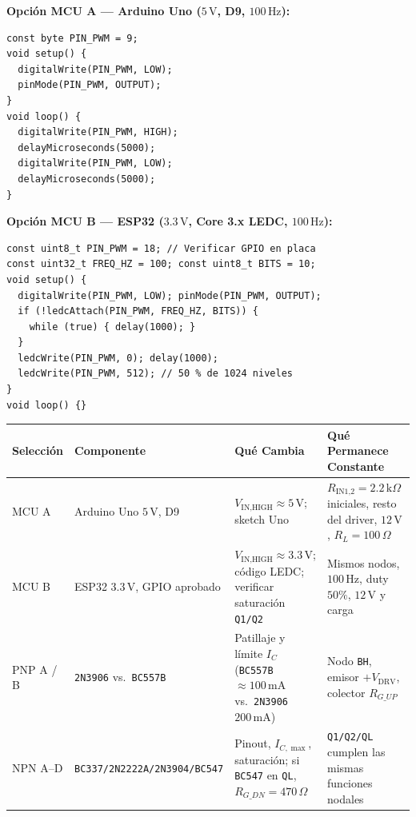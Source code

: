 \documentclass[10pt, a4paper, landscape]{article}
\begin{document}
\begin{minipage}[t]{0.46\linewidth}
\textbf{Opción MCU A — Arduino Uno ($5\,\text{V}$, D9, $100\,\text{Hz}$):}
{\footnotesize
\begin{verbatim}
const byte PIN_PWM = 9;
void setup() {
  digitalWrite(PIN_PWM, LOW);
  pinMode(PIN_PWM, OUTPUT);
}
void loop() {
  digitalWrite(PIN_PWM, HIGH);
  delayMicroseconds(5000);
  digitalWrite(PIN_PWM, LOW);
  delayMicroseconds(5000);
}
\end{verbatim}
}
\end{minipage}\hfill
\begin{minipage}[t]{0.52\linewidth}
\textbf{Opción MCU B — ESP32 ($3.3\,\text{V}$, Core 3.x LEDC, $100\,\text{Hz}$):}
{\footnotesize
\begin{verbatim}
const uint8_t PIN_PWM = 18; // Verificar GPIO en placa
const uint32_t FREQ_HZ = 100; const uint8_t BITS = 10;
void setup() {
  digitalWrite(PIN_PWM, LOW); pinMode(PIN_PWM, OUTPUT);
  if (!ledcAttach(PIN_PWM, FREQ_HZ, BITS)) {
    while (true) { delay(1000); }
  }
  ledcWrite(PIN_PWM, 0); delay(1000);
  ledcWrite(PIN_PWM, 512); // 50 % de 1024 niveles
}
void loop() {}
\end{verbatim}
}
\end{minipage}

\par\vspace{0.1cm}\noindent
\renewcommand{\arraystretch}{1.15}
{\footnotesize
\begin{tabularx}{\linewidth}{|l|l|>{\raggedright\arraybackslash}X|>{\raggedright\arraybackslash}p{7.5cm}|}
\hline
\rowcolor{ucbgray}
\textbf{Selección} & \textbf{Componente} & \textbf{Qué Cambia} & \textbf{Qué Permanece Constante} \\ \hline
MCU A & Arduino Uno $5\,\text{V}$, D9 & $V_{\text{IN,HIGH}} \approx 5\,\text{V}$; sketch Uno & $R_{\text{IN1,2}}=2.2\,\text{k}\Omega$ iniciales, resto del driver, $12\,\text{V}$, $R_L=100\,\Omega$ \\ \hline
MCU B & ESP32 $3.3\,\text{V}$, GPIO aprobado & $V_{\text{IN,HIGH}} \approx 3.3\,\text{V}$; código LEDC; verificar saturación \texttt{Q1/Q2} & Mismos nodos, $100\,\text{Hz}$, duty $50\%$, $12\,\text{V}$ y carga \\ \hline
PNP A / B & \texttt{2N3906} vs.\ \texttt{BC557B} & Patillaje y límite $I_C$ (\texttt{BC557B} $\approx 100\,\text{mA}$ vs.\ \texttt{2N3906} $200\,\text{mA}$) & Nodo \texttt{BH}, emisor $+V_{\text{DRV}}$, colector $R_{G\_UP}$ \\ \hline
NPN A--D & \texttt{BC337/2N2222A/2N3904/BC547} & Pinout, $I_{C,\max}$, saturación; si \texttt{BC547} en \texttt{QL}, $R_{G\_DN}=470\,\Omega$ & \texttt{Q1/Q2/QL} cumplen las mismas funciones nodales \\ \hline
\end{tabularx}
}
\end{document}
